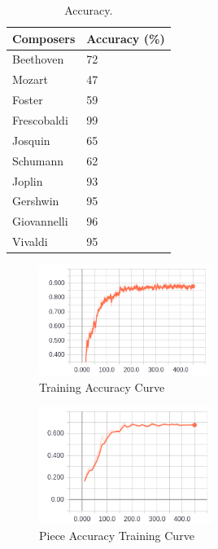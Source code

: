 \documentclass[11pt,a4paper]{article}
\begin{document}

\begin{table}[t!]
\begin{center}
\begin{tabular}{|l|l|}
\hline \bf Composers & \bf Accuracy (\%)\\ \hline
Beethoven & 72 \\
Mozart & 47\\
Foster & 59\\
Frescobaldi & 99\\
Josquin & 65\\
Schumann & 62\\
Joplin & 93\\
Gershwin & 95\\
Giovannelli & 96\\
Vivaldi & 95  \\
\hline
\end{tabular}
\end{center}
\caption{\label{test-accuracy-table}Accuracy. }
\end{table}


\begin{figure}[h]
\caption{Training Accuracy Curve}
\centering
\includegraphics[width=0.5\textwidth]{training_acc.png}
\end{figure}


\begin{figure}[h]
\caption{Piece Accuracy Training Curve}
\centering
\includegraphics[width=0.5\textwidth]{group_acc.png}
\end{figure}
\end{document}
